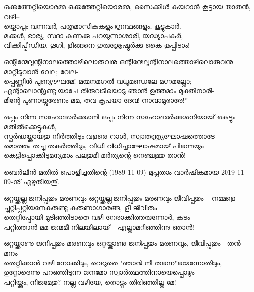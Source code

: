 \begin{enumerate}


\begin{slokam}{\VSv}{\UN}{ഒക്കത്തേറ്റിയൊരമ്മ}
ഒക്കത്തേറ്റിയൊരമ്മ, സൈക്കിൾ കയറാൻ കൂട്ടായ താതൻ, വഴി--\\
യ്ക്കൊപ്പം വന്നവർ, പത്രമാസികകളും ഗ്രന്ഥങ്ങളും, കൂട്ടുകാർ,\\
മക്കൾ, ഭാര്യ, സദാ കണക്കു പറയുന്നാശാരി, യദ്ധ്യാപകർ,\\
വിക്കിപ്പീഡിയ, ഗൂഗി, ളിങ്ങനെ ഗുരുശ്രേഷ്ഠർക്കു  കൈ കൂപ്പിടാം!
\end{slokam}



\begin{slokam}{\VSr}{\Unk}{ഒന്റിന്മേലൂന്റിനാലത്തൊഴിലൊരുവനു}
ഒന്റിന്മേലൂന്റിനാലത്തൊഴിലൊരുവനു മാറ്റീടുവാൻ വേല; വേല-\\
പ്പെണ്ണിൻ പുണ്യൗഘമേ! മന്മനമഗതി വധൂമണ്ഡലേ മഗ്നമല്ലോ;\\
എന്റാലൊന്റുണ്ടു യാചേ തിരുവടിയൊടു ഞാൻ ഉത്തമാം മുക്തിനാരീ-\\
മിന്റേ പൂണായ്വരേണം മമ, തവ കൃപയാ ദേവ! നാവാമുരാരേ!” 
\end{slokam}



\begin{slokam}{\VSv}{\UN}{ഒപ്പം നിന്ന സഹോദരർക്കശനി}
ഒപ്പം നിന്ന സഹോദരർക്കശനിയായ് കെട്ടും മതിൽക്കെട്ടുകൾ,\\
സ്പർദ്ധയ്ക്കായതു നിർത്തിടും വളരെ നാൾ, സ്വാതന്ത്ര്യഘോഷത്തൊടേ\\
മൊത്തം തച്ചു തകർത്തിടും, വിധി വിധിച്ചാഘോഷമായ് പിന്നെയും\\
കെട്ടിപ്പൊക്കിടുമന്യമാം പലതുമീ മർത്യന്റെ നെഞ്ചത്തു താൻ!
\end{slokam}


ബെർലിൻ മതിൽ പൊളിച്ചതിന്റെ (1989-11-09) മുപ്പതാം വാർഷികമായ 2019-11-09-നു്
എഴുതിയതു്.

\begin{slokam}{\VSv}{\UN}{ഒറ്റയ്ക്കല്ല ജനിപ്പതും മരണവും}
ഒറ്റയ്ക്കല്ല ജനിപ്പതും മരണവും ജീവിപ്പതും -- നമ്മളെ---\\
ച്ചുറ്റിപ്പറ്റിയനേകരുണ്ടു കരുണാഗാരങ്ങ, ളീ ജീവിതം\\
തെറ്റിപ്പോയി മുടിഞ്ഞിടാതെ വഴി നേരാക്കിത്തരുന്നോർ, കടം\\
പറ്റിത്താൻ മമ ജന്മമീ നിലയിലായ് -- എല്ലാമറിഞ്ഞിന്നു ഞാൻ!
\end{slokam}


\begin{slokam}{\VSv}{\UN}{ഒറ്റയ്ക്കാണു ജനിപ്പതും മരണവും}
ഒറ്റയ്ക്കാണു ജനിപ്പതും മരണവും,  ജീവിപ്പതും - തൻ മനം \\
തെറ്റിക്കാൻ വഴി നോക്കിടും,  വെറുതെ  "ഞാൻ നീ തന്നെ"യെന്നോതിടും, \\
ഉറ്റോരെന്നു പറഞ്ഞിടുന്ന ജനമോ സ്വാർത്ഥത്തിനായെപ്പൊഴും\\
പറ്റിയ്ക്കും, നിജമേതു? നല്ല വഴിയേ, തൊട്ടും തിരിഞ്ഞില്ല മേ!
\end{slokam}


\end{enumerate}
